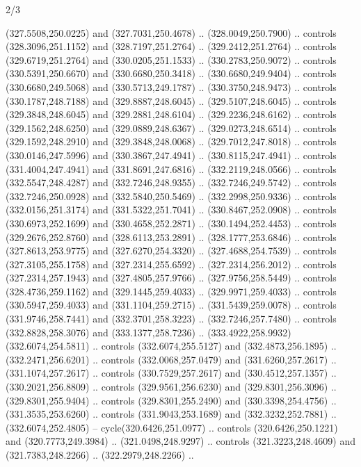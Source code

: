 \begin{flagdescription}{2/3}
\begin{scope}[xshift=0.5\flaglength,yshift=0.5\flagwidth,scale=\flagwidth/235.81]
\begin{scope}[y=0.8pt, x=0.8pt, yscale=-1,shift={(-239.08,-147.38)}]
    (327.5508,250.0225) and (327.7031,250.4678) .. (328.0049,250.7900) .. controls
    (328.3096,251.1152) and (328.7197,251.2764) .. (329.2412,251.2764) .. controls
    (329.6719,251.2764) and (330.0205,251.1533) .. (330.2783,250.9072) .. controls
    (330.5391,250.6670) and (330.6680,250.3418) .. (330.6680,249.9404) .. controls
    (330.6680,249.5068) and (330.5713,249.1787) .. (330.3750,248.9473) .. controls
    (330.1787,248.7188) and (329.8887,248.6045) .. (329.5107,248.6045) .. controls
    (329.3848,248.6045) and (329.2881,248.6104) .. (329.2236,248.6162) .. controls
    (329.1562,248.6250) and (329.0889,248.6367) .. (329.0273,248.6514) .. controls
    (329.1592,248.2910) and (329.3848,248.0068) .. (329.7012,247.8018) .. controls
    (330.0146,247.5996) and (330.3867,247.4941) .. (330.8115,247.4941) .. controls
    (331.4004,247.4941) and (331.8691,247.6816) .. (332.2119,248.0566) .. controls
    (332.5547,248.4287) and (332.7246,248.9355) .. (332.7246,249.5742) .. controls
    (332.7246,250.0928) and (332.5840,250.5469) .. (332.2998,250.9336) .. controls
    (332.0156,251.3174) and (331.5322,251.7041) .. (330.8467,252.0908) .. controls
    (330.6973,252.1699) and (330.4658,252.2871) .. (330.1494,252.4453) .. controls
    (329.2676,252.8760) and (328.6113,253.2891) .. (328.1777,253.6846) .. controls
    (327.8613,253.9775) and (327.6270,254.3320) .. (327.4688,254.7539) .. controls
    (327.3105,255.1758) and (327.2314,255.6592) .. (327.2314,256.2012) .. controls
    (327.2314,257.1943) and (327.4805,257.9766) .. (327.9756,258.5449) .. controls
    (328.4736,259.1162) and (329.1445,259.4033) .. (329.9971,259.4033) .. controls
    (330.5947,259.4033) and (331.1104,259.2715) .. (331.5439,259.0078) .. controls
    (331.9746,258.7441) and (332.3701,258.3223) .. (332.7246,257.7480) .. controls
    (332.8828,258.3076) and (333.1377,258.7236) ..
    (333.4922,258.9932)(332.6074,254.5811) .. controls (332.6074,255.5127) and
    (332.4873,256.1895) .. (332.2471,256.6201) .. controls (332.0068,257.0479) and
    (331.6260,257.2617) .. (331.1074,257.2617) .. controls (330.7529,257.2617) and
    (330.4512,257.1357) .. (330.2021,256.8809) .. controls (329.9561,256.6230) and
    (329.8301,256.3096) .. (329.8301,255.9404) .. controls (329.8301,255.2490) and
    (330.3398,254.4756) .. (331.3535,253.6260) .. controls (331.9043,253.1689) and
    (332.3232,252.7881) .. (332.6074,252.4805) -- cycle(320.6426,251.0977) ..
    controls (320.6426,250.1221) and (320.7773,249.3984) .. (321.0498,248.9297) ..
    controls (321.3223,248.4609) and (321.7383,248.2266) .. (322.2979,248.2266) ..

\end{scope}
\end{scope}
\end{flagdescription}
